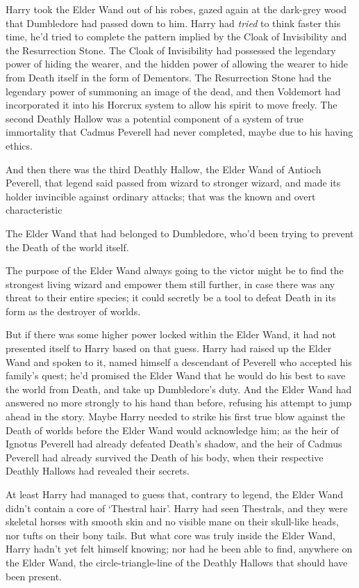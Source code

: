 Harry took the Elder Wand out of his robes, gazed again at the dark-grey wood
that Dumbledore had passed down to him. Harry had \emph{tried} to think faster
this time, he'd tried to complete the pattern implied by the Cloak of
Invisibility and the Resurrection Stone. The Cloak of Invisibility had
possessed the legendary power of hiding the wearer, and the hidden power of
allowing the wearer to hide from Death itself in the form of Dementors. The
Resurrection Stone had the legendary power of summoning an image of the dead,
and then Voldemort had incorporated it into his Horcrux system to allow his
spirit to move freely. The second Deathly Hallow was a potential component of a
system of true immortality that Cadmus Peverell had never completed, maybe due
to his having ethics.

And then there was the third Deathly Hallow, the Elder Wand of Antioch
Peverell, that legend said passed from wizard to stronger wizard, and made its
holder invincible against ordinary attacks; that was the known and overt
characteristic{\el}

The Elder Wand that had belonged to Dumbledore, who'd been trying to prevent
the Death of the world itself.

The purpose of the Elder Wand always going to the victor might be to find the
strongest living wizard and empower them still further, in case there was any
threat to their entire species; it could secretly be a tool to defeat Death in
its form as the destroyer of worlds.

But if there was some higher power locked within the Elder Wand, it had not
presented itself to Harry based on that guess. Harry had raised up the Elder
Wand and spoken to it, named himself a descendant of Peverell who accepted his
family's quest; he'd promised the Elder Wand that he would do his best to save
the world from Death, and take up Dumbledore's duty. And the Elder Wand had
answered no more strongly to his hand than before, refusing his attempt to jump
ahead in the story. Maybe Harry needed to strike his first true blow against
the Death of worlds before the Elder Wand would acknowledge him; as the heir of
Ignotus Peverell had already defeated Death's shadow, and the heir of Cadmus
Peverell had already survived the Death of his body, when their respective
Deathly Hallows had revealed their secrets.

At least Harry had managed to guess that, contrary to legend, the Elder Wand
didn't contain a core of `Thestral hair'. Harry had seen Thestrals, and they
were skeletal horses with smooth skin and no visible mane on their skull-like
heads, nor tufts on their bony tails. But what core was truly inside the Elder
Wand, Harry hadn't yet felt himself knowing; nor had he been able to find,
anywhere on the Elder Wand, the circle-triangle-line of the Deathly Hallows
that should have been present.

